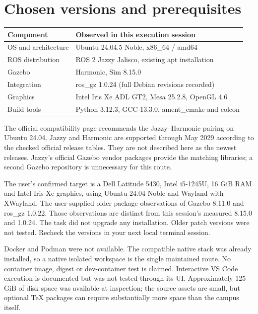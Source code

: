 \section{Chosen versions and prerequisites}
\begin{center}\begin{tabular}{p{.30\linewidth}p{.60\linewidth}}\toprule
Component & Observed in this execution session\\\midrule
OS and architecture & Ubuntu 24.04.5 Noble, x86\_64 / amd64\\
ROS distribution & ROS 2 Jazzy Jalisco, existing apt installation\\
Gazebo & Harmonic, Sim 8.15.0\\
Integration & ros\_gz 1.0.24 (full Debian revisions recorded)\\
Graphics & Intel Iris Xe ADL GT2, Mesa 25.2.8, OpenGL 4.6\\
Build tools & Python 3.12.3, GCC 13.3.0, ament\_cmake and colcon\\\bottomrule
\end{tabular}\end{center}

The official compatibility page recommends the Jazzy--Harmonic pairing on Ubuntu 24.04. Jazzy and Harmonic are supported through May 2029 according to the checked official release tables. They are not described here as the newest releases. Jazzy's official Gazebo vendor packages provide the matching libraries; a second Gazebo repository is unnecessary for this route.

The user's confirmed target is a Dell Latitude 5430, Intel i5-1245U, 16 GiB RAM and Intel Iris Xe graphics, using Ubuntu 24.04 Noble and Wayland with XWayland. The user supplied older package observations of Gazebo 8.11.0 and ros\_gz 1.0.22. Those observations are distinct from this session's measured 8.15.0 and 1.0.24. The task did not upgrade any installation. Older patch versions were not tested. Recheck the versions in your next local terminal session.

Docker and Podman were not available. The compatible native stack was already installed, so a native isolated workspace is the single maintained route. No container image, digest or dev-container test is claimed. Interactive VS Code execution is documented but was not tested through its UI. Approximately 125 GiB of disk space was available at inspection; the source assets are small, but optional TeX packages can require substantially more space than the campus itself.

